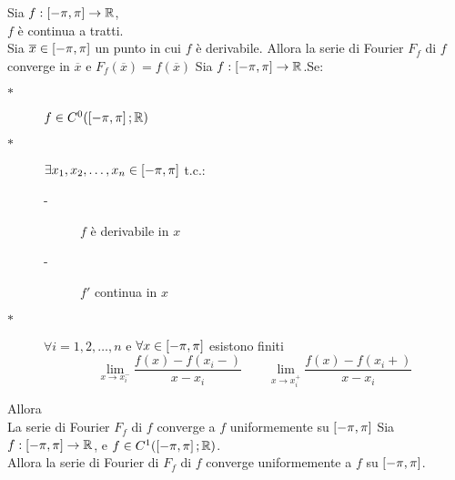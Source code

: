 \corollary
Sia $f:\left[-\pi,\pi\right]\to \mathbb{R}$,\\
$f$ è continua a tratti.\\
Sia $\overline{x}\in\left[-\pi,\pi\right]$ un punto in cui $f$ è derivabile. Allora la serie di Fourier $F_f$ di $f$ converge in $\overline{x}$ e $F_f(\overline{x})=f(\overline{x})$
\proposition
Sia $f:\left[-\pi,\pi\right]\to \mathbb{R}$.Se:\\
\begin{description}
	\item[$\ast$] $f\in C^0(\left[-\pi,\pi\right]; \mathbb{R})$
	\item[$\ast$] $\exists x_1,x_2,\ldots,x_n\in\left[-\pi,\pi\right]$ t.c.:
	\begin{description}
		\item[-] $f$ è derivabile in $x$
		\item[-] $f'$ continua in $x$
	\end{description}
	\item[$\ast$] $\forall i=1,2,\ldots,n$ e $\forall x\in\left[-\pi,\pi\right]$ esistono finiti
	$$\lim\limits_{x\to x_i^{-}}\frac{f(x)-f(x_i-)}{x-x_i}\qquad \lim\limits_{x\to x_i^{+}}\frac{f(x)-f(x_i+)}{x-x_i}$$
	
\end{description}
Allora\\
La serie di Fourier $F_f$ di $f$ converge a $f$ uniformemente su $\left[-\pi,\pi\right]$
\corollary
Sia $f:\left[-\pi,\pi\right]\to \mathbb{R}$, e $f\in C^1(\left[-\pi,\pi\right]; \mathbb{R})$.\\
Allora la serie di Fourier di $F_f$ di $f$ converge uniformemente a $f$ su $\left[-\pi,\pi\right]$.








 
